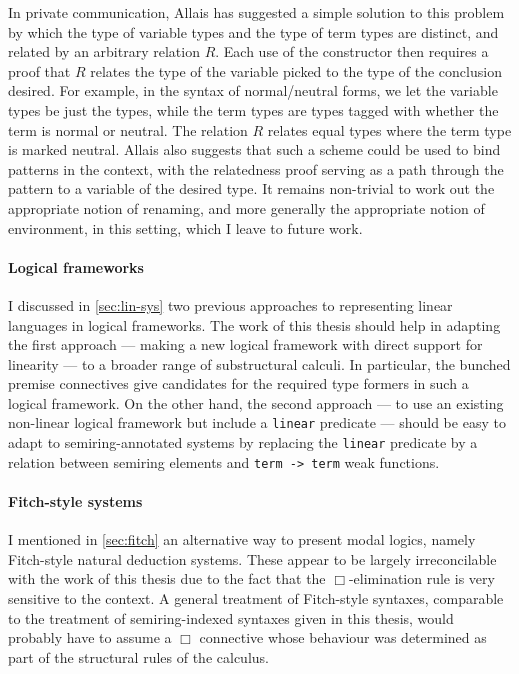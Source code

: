 In private communication, Allais has suggested a simple solution to this problem
by which the type of variable types and the type of term types are distinct, and
related by an arbitrary relation $R$.
Each use of the  constructor then requires a
proof that $R$ relates the type of the variable picked to the type of the
conclusion desired.
For example, in the syntax of normal/neutral forms, we let the variable types be
just the types, while the term types are types tagged with whether the term is
normal or neutral.
The relation $R$ relates equal types where the term type is marked neutral.
Allais also suggests that such a scheme could be used to bind patterns in the
context, with the relatedness proof serving as a path through the pattern to a
variable of the desired type.
It remains non-trivial to work out the appropriate notion of renaming, and more
generally the appropriate notion of environment, in this setting, which I leave
to future work.

\paragraph{Logical frameworks}
I discussed in \cref{sec:lin-sys} two previous approaches to representing linear
languages in logical frameworks.
The work of this thesis should help in adapting the first approach --- making a
new logical framework with direct support for linearity --- to a broader range
of substructural calculi.
In particular, the bunched premise connectives give candidates for the required
type formers in such a logical framework.
On the other hand, the second approach --- to use an existing non-linear logical
framework but include a \texttt{linear} predicate --- should be easy to adapt to
semiring-annotated systems by replacing the \texttt{linear} predicate by a
relation between semiring elements and \texttt{term -> term} weak functions.

\paragraph{Fitch-style systems}
I mentioned in \cref{sec:fitch} an alternative way to present modal logics,
namely Fitch-style natural deduction systems.
These appear to be largely irreconcilable with the work of this thesis due to
the fact that the $\Box$-elimination rule is very sensitive to the context.
A general treatment of Fitch-style syntaxes, comparable to the treatment of
semiring-indexed syntaxes given in this thesis, would probably have to assume a
$\Box$ connective whose behaviour was determined as part of the structural rules
of the calculus.
